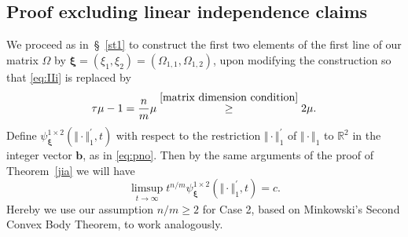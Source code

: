 \documentclass[10pt]{amsart}
\theoremstyle{definition}
\newcommand{\ux}{\boldsymbol{\xi}}
\newcommand{\bb}{\boldsymbol{b}}
\newcommand{\R}{\mathbb{R}}
\begin{document}
\subsection{Proof excluding linear independence claims} \label{sec61}

We proceed as in~\S~\ref{st1}  to construct the first two elements of the first line of our matrix $\Omega$ by $\ux=(\xi_1,\xi_2)=(\Omega_{1,1}, \Omega_{1,2})$, upon 
modifying the construction so that \eqref{eq:IIi} is replaced by
\[
\tau \mu -1 = \frac{n}{m} \mu \overset{\eqref{matrix dimension condition}}{\ge}  2\mu.
\]
Define $\psi_{\ux}^{1\times 2}(\Vert\cdot\Vert_1^{\prime}, t)$ with respect to the restriction $\Vert\cdot\Vert_1^{\prime}$
of $\Vert\cdot\Vert_1$ to $\R^2$ in the integer vector $\bb$, as in \eqref{eq:pno}.
Then by the same arguments of the proof of Theorem~\ref{jia} we will have
\begin{equation} \label{eq:fichte}
\limsup_{t\to\infty} t^{n/m} \psi_{\ux}^{1\times 2}(\Vert\cdot\Vert_1^{\prime}, t)= c.
\end{equation}
Hereby we use our assumption $n/m\ge 2$ for Case 2, based on Minkowski's Second Convex Body Theorem, to work analogously.
\end{document}
